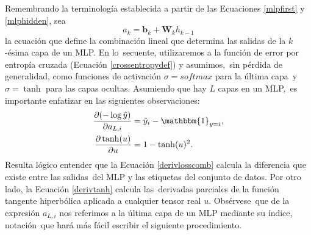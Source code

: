 Remembrando la terminología establecida a partir de las Ecuaciones \ref{mlpfirst} y \ref{mlphidden}, sea
\begin{equation}
  a_k = \bm{b}_k + \bm{W}_kh_{k-1} \label{mlplinearcomb}
\end{equation}
la ecuación que define la combinación lineal que determina las salidas de la $k$-ésima capa de un MLP. En lo\
secuente, utilizaremos a la función de error por entropía cruzada (Ecuación \ref{crossentropydef}) y asumimos,\
sin pérdida de generalidad, como funciones de activación $\sigma = softmax$ para la última capa\
y $\sigma = \tanh$ para las capas ocultas. Asumiendo que hay $L$ capas en un MLP,\
es importante enfatizar en las siguientes observaciones:
\begin{align}
  \frac{\partial(-\log \hat{y})}{\partial a_{L, i}} &= \hat{y}_i - \mathbbm{1}_{y=i}, \label{derivlosscomb}\\
  \frac{\partial \tanh(u)}{\partial u} &= 1 - \tanh(u)^2. \label{derivtanh}
\end{align}
Resulta lógico entender que la Ecuación \ref{derivlosscomb} calcula la diferencia que existe entre las salidas\
del MLP y las etiquetas del conjunto de datos. Por otro lado, la Ecuación \ref{derivtanh} calcula las\
derivadas parciales de la función tangente hiperbólica aplicada a cualquier tensor real $u$. Obsérvese\
que de la expresión $a_{L, i}$ nos referimos a la última capa de un MLP mediante su índice, notación\
que hará más fácil escribir el siguiente procedimiento.\par
